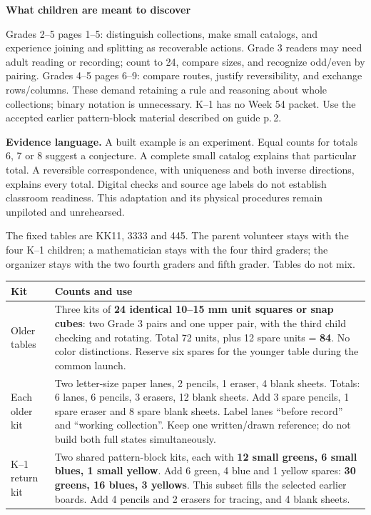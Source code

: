\documentclass[letterpaper,11pt]{article}
\newcommand{\heading}[1]{\vspace{4pt}{\large\bfseries #1}\par}
\newcommand{\subhead}[1]{\vspace{3pt}\textbf{#1}\par}
\begin{document}
\subhead{What children are meant to discover}
Grades 2--5 pages 1--5: distinguish collections, make small catalogs, and experience joining and splitting as recoverable actions. Grade 3 readers may need adult reading or recording; count to 24, compare sizes, and recognize odd/even by pairing. Grades 4--5 pages 6--9: compare routes, justify reversibility, and exchange rows/columns. These demand retaining a rule and reasoning about whole collections; binary notation is unnecessary. K--1 has no Week 54 packet. Use the accepted earlier pattern-block material described on guide p.\,2.

\textbf{Evidence language.} A built example is an experiment. Equal counts for totals 6, 7 or 8 suggest a conjecture. A complete small catalog explains that particular total. A reversible correspondence, with uniqueness and both inverse directions, explains every total. Digital checks and source age labels do not establish classroom readiness. This adaptation and its physical procedures remain unpiloted and unrehearsed.
\newpage

\heading{Preparation for eleven children and three anchored adults}
The fixed tables are KK11, 3333 and 445. The parent volunteer stays with the four K--1 children; a mathematician stays with the four third graders; the organizer stays with the two fourth graders and fifth grader. Tables do not mix.

\begin{tabularx}{\linewidth}{@{}L{1.23in}X@{}}\toprule
Kit & Counts and use\\\midrule
Older tables & Three kits of \textbf{24 identical 10--15 mm unit squares or snap cubes}: two Grade 3 pairs and one upper pair, with the third child checking and rotating. Total 72 units, plus 12 spare units = \textbf{84}. No color distinctions. Reserve six spares for the younger table during the common launch.\\
Each older kit & Two letter-size paper lanes, 2 pencils, 1 eraser, 4 blank sheets. Totals: 6 lanes, 6 pencils, 3 erasers, 12 blank sheets. Add 3 spare pencils, 1 spare eraser and 8 spare blank sheets. Label lanes ``before record'' and ``working collection''. Keep one written/drawn reference; do not build both full states simultaneously.\\
K--1 return kit & Two shared pattern-block kits, each with \textbf{12 small greens, 6 small blues, 1 small yellow}. Add 6 green, 4 blue and 1 yellow spares: \textbf{30 greens, 16 blues, 3 yellows}. This subset fills the selected earlier boards. Add 4 pencils and 2 erasers for tracing, and 4 blank sheets.\\\bottomrule
\end{tabularx}
\end{document}
